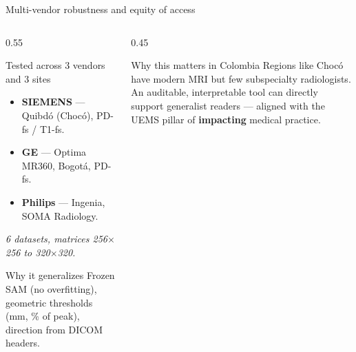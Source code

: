 \begin{frame}{Multi-vendor robustness and equity of access}
  \begin{columns}[T]
    \begin{column}{0.55\textwidth}
      \begin{block}{Tested across 3 vendors and 3 sites}
        \begin{itemize}\small
          \item \textbf{SIEMENS} --- Quibd\'o (Choc\'o), PD-fs / T1-fs.
          \item \textbf{GE} --- Optima MR360, Bogot\'a, PD-fs.
          \item \textbf{Philips} --- Ingenia, SOMA Radiology.
        \end{itemize}
        \emph{6 datasets, matrices 256$\times$256 to 320$\times$320.}
      \end{block}
      \begin{block}{Why it generalizes}
        Frozen SAM (no overfitting), \alert{geometric} thresholds (mm, \% of peak), direction from DICOM headers.
      \end{block}
    \end{column}
    \begin{column}{0.45\textwidth}
      \begin{block}{Why this matters in Colombia}
        Regions like \alert{Choc\'o} have modern MRI but few subspecialty radiologists. An auditable, interpretable tool can directly support generalist readers --- aligned with the UEMS pillar of \textbf{impacting} medical practice.
      \end{block}
    \end{column}
  \end{columns}
\end{frame}
